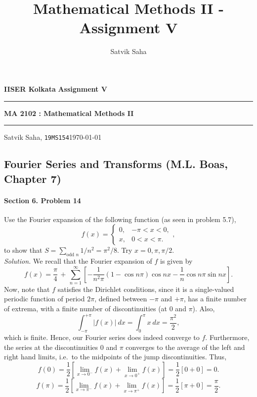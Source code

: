 \documentclass[10pt]{article}
\title{Mathematical Methods II - Assignment V}
\author{Satvik Saha}
\date{}
\begin{document}
        \par\textbf{IISER Kolkata} \hfill \textbf{Assignment V}
        \vspace{3pt}
        \hrule
        \vspace{3pt}
        \begin{center}
                \LARGE{\textbf{MA 2102 : Mathematical Methods II}}
        \end{center}
        \vspace{3pt}
        \hrule
        \vspace{3pt}
        Satvik Saha, \texttt{19MS154}\hfill\today
        \vspace{20pt}
        \subsection*{Fourier Series and Transforms (M.L. Boas, Chapter 7)}
        
        \paragraph{Section 6. Problem 14} Use the Fourier expansion of the following function (as seen in problem 5.7),
        \[
                f(x) = \begin{cases}
                        0, & -\pi < x < 0,      \\
                        x, & 0 < x < \pi.
                \end{cases},
        \]
        to show that $S = \sum_{\text{odd }n} 1 /n^2 = \pi^2 /8$. 
        Try $x = 0, \pi, \pi/2$.\\
        
        \textit{Solution.} We recall that the Fourier expansion of $f$ is given by
        \[
                f(x) = \frac{\pi}{4} \,+\, \sum_{n = 1}^\infty\left[ -\frac{1}{n^2\pi}(1 - \cos{n\pi})\cos{nx} - \frac{1}{n}\cos{n\pi}\sin{nx} \right].
        \]
        Now, note that $f$ satisfies the Dirichlet conditions, since it is a single-valued periodic function of period $2\pi$,
        defined between $-\pi$ and $+\pi$, has a finite number of extrema, with a finite number of discontinuities (at $0$ and $\pi$).
        Also,
        \[
                \int_{-\pi}^{+\pi} |f(x)|\: dx = \int_{0}^\pi x\:dx = \frac{\pi^2}{2},
        \]
        which is finite. Hence, our Fourier series does indeed converge to $f$. Furthermore, the series at the discontinuities $0$ and $\pi$
        converges to the average of the left and right hand limits, i.e.\ to the midpoints of the jump discontinuities.
        Thus,
        \[
                f(0) = \frac{1}{2}\left[\lim_{x\to 0^-} f(x) + \lim_{x \to 0^+} f(x)\right] = \frac{1}{2}[0 + 0] = 0.
        \]
        \[
                f(\pi) = \frac{1}{2}\left[\lim_{x\to \pi^-} f(x) + \lim_{x \to \pi^+} f(x)\right] = \frac{1}{2}[\pi + 0] = \frac{\pi}{2}.
        \]
\end{document}
